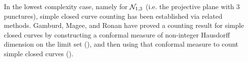 


In the lowest complexity case, namely for $\mathcal{N}_{1,3}$ (i.e. the projective plane with $3$ punctures), simple closed curve counting has been established via related methods.
Gamburd, Magee, and Ronan have proved a counting result for simple closed curves by constructing a conformal measure of non-integer Hausdorff dimension on the limit set (\cite[Theorem 10]{10.4007/annals.2019.190.3.2}), and then using that conformal measure to count simple closed curves (\cite[Theorem 2]{10.1093/imrn/rny112}).




